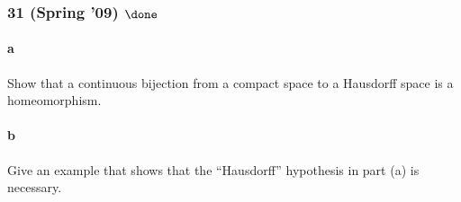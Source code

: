 \hypertarget{spring-09-done}{%
\subsubsection{\texorpdfstring{31 (Spring '09)
\(\done\)}{31 (Spring '09) \textbackslash done}}\label{spring-09-done}}

\hypertarget{a-7}{%
\paragraph{a}\label{a-7}}

Show that a continuous bijection from a compact space to a Hausdorff
space is a homeomorphism.

\hypertarget{b-7}{%
\paragraph{b}\label{b-7}}

Give an example that shows that the ``Hausdorff'' hypothesis in part (a)
is necessary.


